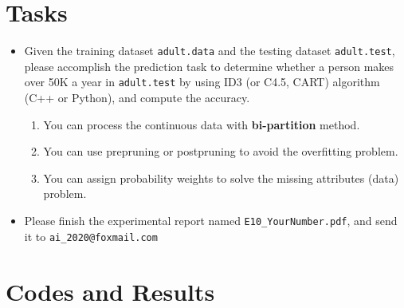 \documentclass[a4paper, 11pt]{article}
\begin{document}
\section{Tasks}
\begin{itemize}
\item Given the training dataset \texttt{adult.data} and the testing dataset \texttt{adult.test}, please accomplish the prediction task to determine whether a person makes over 50K a year in \texttt{adult.test} by using ID3 (or C4.5, CART) algorithm (C++ or Python), and compute the accuracy. 
\begin{enumerate}
\item You can process the continuous data with \textbf{bi-partition} method.
\item You can use prepruning or postpruning to avoid the overfitting problem.
\item You can assign probability weights to solve the missing attributes (data) problem.
\end{enumerate}

\item Please finish the experimental report named \texttt{E10\_YourNumber.pdf}, and send it to \texttt{ai\_2020@foxmail.com}
\end{itemize}

\section{Codes and Results}


%
%
\end{document}
